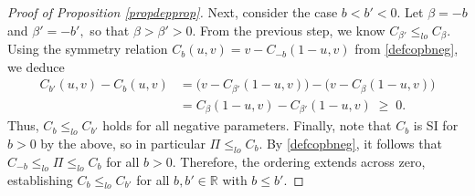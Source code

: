 \documentclass{article}
\theoremstyle{plain}
\theoremstyle{definition}
\newcommand{\R}{\mathbb{R}}
\begin{document}
\begin{proof}[Proof of Proposition \ref{propdepprop}]
    Next, consider the case $b < b' < 0.$ Let $\beta = -b$ and $\beta' = -b',$ so that $\beta > \beta' > 0.$
    From the previous step, we know $C_{\beta'} \le_{lo} C_{\beta}.$
    Using the symmetry relation $C_b(u,v) = v - C_{-b}(1-u, v)$ from \eqref{defcopbneg}, we deduce
    \begin{align*}
        C_{b'}(u,v) - C_b(u,v)
        &= \bigl(v - C_{\beta'}(1-u, v)\bigr) - \bigl(v - C_{\beta}(1-u, v)\bigr) \\
        &= C_{\beta}(1-u, v) - C_{\beta'}(1-u, v) \;\ge\; 0.
    \end{align*}
    Thus, $C_b \le_{lo} C_{b'}$ holds for all negative parameters.
    Finally, note that $C_b$ is SI for $b>0$ by the above, so in particular $\Pi\leq_{lo} C_b$.
    By \eqref{defcopbneg}, it follows that $C_{-b} \leq_{lo} \Pi \leq_{lo} C_{b}$ for all $b>0$.
    Therefore, the ordering extends across zero, establishing $C_b \le_{lo} C_{b'}$ for all $b,b'\in \R$ with \(b \leq b'\).
\end{proof}
\end{document}
